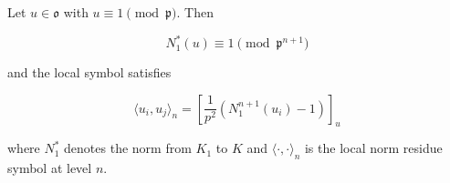 Let $u \in \mathfrak{o}$ with $u \equiv 1 \pmod{\mathfrak{p}}$. Then

$$
N_1^*(u) \equiv 1 \pmod{\mathfrak{p}^{n+1}}
$$

and the local symbol satisfies

$$
\langle u_i, u_j \rangle_n = \left[ \frac{1}{p^2} \left( N_1^{n+1}(u_i) - 1 \right) \right]_u
$$

where $N_1^*$ denotes the norm from $K_1$ to $K$ and $\langle \cdot, \cdot \rangle_n$ is the local norm residue symbol at level $n$.

